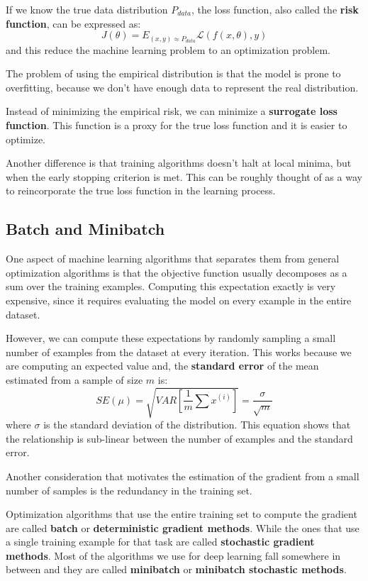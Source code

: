 If we know the true data distribution $P_{data}$, the loss function, also called
the \textbf{risk function}, can be expressed as:
\begin{equation}
    J(\theta) = E_{(x, y) \approx P_{data}} \mathcal{L}(f(x, \theta), y)
\end{equation}
and this reduce the machine learning problem to an optimization problem.

The problem of using the empirical distribution is that the model is prone to
overfitting, because we don't have enough data to represent the real distribution.

Instead of minimizing the empirical risk, we can minimize a \textbf{surrogate
    loss function}. This function is a proxy for the true loss function and it
is easier to optimize.

Another difference is that training algorithms doesn't halt at local minima, but
when the early stopping criterion is met. This can be roughly thought of as a
way to reincorporate the true loss function in the learning process.
\subsection{Batch and Minibatch}
One aspect of machine learning algorithms that separates them from general
optimization algorithms is that the objective function usually decomposes as a
sum over the training examples. Computing this expectation exactly is very
expensive, since it requires evaluating the model on every example in the entire
dataset.

However, we can compute these expectations by randomly sampling a small number
of examples from the dataset at every iteration. This works because we are
computing an expected value and, the \textbf{standard error} of the mean estimated
from a sample of size $m$ is:
\begin{equation}
    SE(\mu) = \sqrt{VAR\left[\frac{1}{m}\sum x^{(i)}\right]} = \frac{\sigma}{\sqrt{m}}
\end{equation}
where $\sigma$ is the standard deviation of the distribution. This equation shows
that the relationship is sub-linear between the number of examples and the standard error.

Another consideration that motivates the estimation of the gradient from a
small number of samples is the redundancy in the training set.

Optimization algorithms that use the entire training set to compute the gradient
are called \textbf{batch} or \textbf{deterministic gradient methods}. While the
ones that use a single training example for that task are called \textbf{stochastic
    gradient methods}. Most of the algorithms we use for deep learning fall
somewhere in between and they are called \textbf{minibatch} or \textbf{minibatch
    stochastic methods}.

